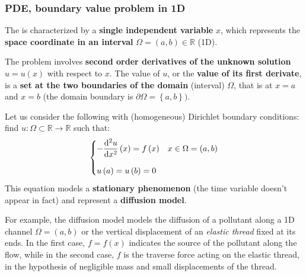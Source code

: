 \subsubsection{PDE, boundary value problem in 1D}

The  is characterized by a \textbf{single independent variable} $x$, which represents the \textbf{space coordinate in an interval} $\Omega = \left(a,b\right) \in \mathbb{R}$ (1D).

\highspace
The problem involves \textbf{second order derivatives of the unknown solution} $u = u\left(x\right)$ with respect to $x$. The value of $u$, or the \textbf{value of its first derivate}, is a \textbf{set at the two boundaries of the domain} (interval) $\Omega$, that is at $x = a$ and $x = b$ (the domain boundary is $\partial\Omega = \left\{a,b\right\})$.

\highspace
Let us consider the following  with (homogeneous) Dirichlet boundary conditions: find $u : \Omega \subset \mathbb{R} \rightarrow \mathbb{R}$ such that:
\begin{equation}\label{eq: Poisson problem}
    \begin{cases}
        -\dfrac{\mathrm{d}^{2}u}{\mathrm{d}x^{2}}\left(x\right) = f\left(x\right) & x \in \Omega = \left(a,b\right) \vspace{1em} \\
        u\left(a\right) = u\left(b\right) = 0
    \end{cases}
\end{equation}
This equation models a \textbf{stationary phenomenon} (the time variable doesn't appear in fact) and represent a \textbf{diffusion model}.

\highspace
\begin{examplebox}
    For example, the diffusion model models the diffusion of a pollutant along a 1D channel $\Omega = \left(a,b\right)$ or the vertical displacement of an \emph{elastic thread} fixed at its ends. In the first case, $f = f\left(x\right)$ indicates the source of the pollutant along the flow, while in the second case, $f$ is the traverse force acting on the elastic thread, in the hypothesis of negligible mass and small displacements of the thread.
\end{examplebox}

